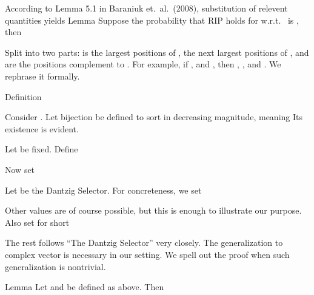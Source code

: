 According to Lemma 5.1 in Baraniuk et.\ al.\ (2008), substitution of relevent quantities yields
\Result
{Lemma}
{
Suppose the probability that RIP holds for  w.r.t.\  is , then
}

\stopsection

\startsection [title={Expected Error for Complex-Case Dantzig Selector}]

Split  into two parts:  is the largest  positions of ,  the next  largest positions of , and  are the positions complement to .
For example, if , and , then , , and .
We rephrase it formally.

\Result
{Definition}
{
Consider .
Let bijection  be defined to sort  in decreasing magnitude, meaning
Its existence is evident.

Let  be fixed.
Define
}

Now set

Let  be the Dantzig Selector.
For concreteness, we set

Other values are of course possible, but this is enough to illustrate our purpose.
Also set for short


The rest follows ``The Dantzig Selector'' very closely.
The generalization to complex vector is necessary in our setting.
We spell out the proof when such generalization is nontrivial.

\Result
{Lemma}
{
Let  and  be defined as above.
Then
}

